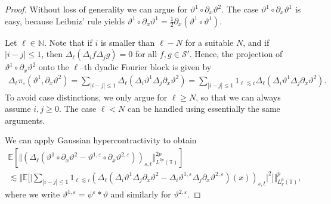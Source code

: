 \documentclass[11pt,a4paper]{article}
\theoremstyle{remark}
\newcommand{\N}{\mathbb{N}}
\newcommand{\E}{\mathbb{E}}
\begin{document}
\begin{proof}
   Without loss of generality we can argue for $\vartheta^1 \circ \partial_x \vartheta^2$. The case $\vartheta^1 \circ \partial_x \vartheta^1$ is easy, because Leibniz' rule yields $\vartheta^1 \circ \partial_x \vartheta^1 = \frac{1}{2} \partial_x(\vartheta^1 \circ \vartheta^1)$.
  
   Let $\ell \in \N$. Note that if $i$ is smaller than $\ell - N$ for a suitable $N$, and if $| i - j | \leqslant 1$, then $\Delta_{\ell}(\Delta_i f \Delta_j g) = 0$ for all $f, g \in \mathcal{S}'$. Hence, the projection of $\vartheta^1\circ \partial_x\vartheta^2$ onto the $\ell$--th dyadic Fourier block is given by
   \begin{align*}
      \Delta_{\ell} \pi_{\circ}(\vartheta^1, \partial_x \vartheta^2 ) = \sum_{| i- j | \leqslant 1} \Delta_{\ell}(\Delta_i \vartheta^1 \Delta_j\partial_x \vartheta^2) = \sum_{|i-j|\leqslant 1} 1_{\ell \lesssim i} \Delta_{\ell} (\Delta_i \vartheta^1 \Delta_j \partial_x \vartheta^2).
   \end{align*}
   To avoid case distinctions, we only argue for $\ell \ge N$, so that we can always assume $i, j  \ge 0$. The case $\ell < N$ can be handled using essentially the same arguments.
      
   We can apply Gaussian hypercontractivity to obtain
   \begin{gather}\label{e:burgers area hypercontractivity} \nonumber
      \E [\Vert  (\Delta_{\ell} ( \vartheta^1\circ \partial_x \vartheta^2 - \vartheta^{1,\varepsilon} \circ \partial_x \vartheta^{2,\varepsilon}) )_{s,t} \Vert_{L^{2 p}(\mathbb{T})}^{2 p}] \\
      \lesssim \biggl\Vert  \E\biggl[\biggl| \sum_{|i-j| \leqslant 1} 1_{\ell \lesssim i} ( \Delta_{\ell} ( \Delta_i \vartheta^1 \Delta_j \partial_x \vartheta^2 -  \Delta_i \vartheta^{1,\varepsilon} \Delta_j \partial_x \vartheta^{2,\varepsilon} )(x))_{s,t}\biggr|^2\biggr] \biggr\Vert_{L^p_x(\mathbb{T})}^p,
   \end{gather}
   where we write $\vartheta^{1, \varepsilon} = \psi^\varepsilon \ast \vartheta$ and similarly for $\vartheta^{2, \varepsilon}$. 
   

\end{proof}
\end{document}
